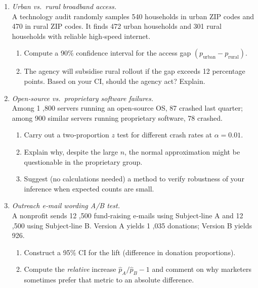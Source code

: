 \documentclass[11pt]{article}
\begin{document}
\begin{enumerate}[label=\textbf{Q\,\arabic*:}, start=16, left=0pt]

\item  \emph{Urban vs.\ rural broadband access.} \\
      A technology audit randomly samples 540 households in urban ZIP codes and 470 in rural ZIP codes.  
      It finds 472 urban households and 301 rural households with reliable high‑speed internet.
      \begin{enumerate}[label=(\alph*)]
          \item Compute a 90\% confidence interval for the access gap $(p_{\text{urban}}-p_{\text{rural}})$.  
          \item The agency will subsidise rural rollout if the gap exceeds 12 percentage points.  
                Based on your CI, should the agency act?  Explain.  
      \end{enumerate}

\item  \emph{Open‑source vs.\ proprietary software failures.} \\
      Among 1 ,800 servers running an open‑source OS, 87 crashed last quarter;  
      among 900 similar servers running proprietary software, 78 crashed.
      \begin{enumerate}[label=(\alph*)]
          \item Carry out a two‑proportion $z$ test for different crash rates at $\alpha=0.01$.  
          \item Explain why, despite the large $n$, the normal approximation might be questionable in the proprietary group.  
          \item Suggest (no calculations needed) a method to verify robustness of your inference when expected counts are small.
      \end{enumerate}

\item  \emph{Outreach e‑mail wording A/B test.} \\
      A nonprofit sends 12 ,500 fund‑raising e‑mails using Subject‑line A and 12 ,500 using Subject‑line B.  
      Version A yields 1 ,035 donations; Version B yields 926.
      \begin{enumerate}[label=(\alph*)]
          \item Construct a 95\% CI for the lift (difference in donation proportions).  
          \item Compute the \emph{relative} increase $\hat{p}_A/\hat{p}_B-1$ and
                comment on why marketers sometimes prefer that metric to an absolute difference.  
      \end{enumerate}


\end{enumerate}
\end{document}
